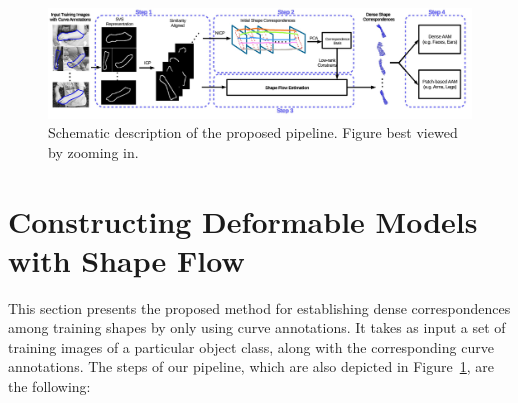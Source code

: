 \begin{figure}[t!]
    \centering
        \includegraphics[width=\textwidth]{resources/Annotation_Correction/architecture3}
    \caption{Schematic description of the proposed pipeline. Figure best viewed by zooming in.}
    \label{fig:archi}
\end{figure}

\section{Constructing Deformable Models with Shape Flow}




This section presents the proposed method for establishing dense correspondences among training shapes
by only using curve annotations.
%
%
%
It takes as input a set of training images of a particular object class, along with the corresponding curve annotations. The steps of our pipeline, which are also depicted in Figure~\ref{fig:archi}, are the following:

